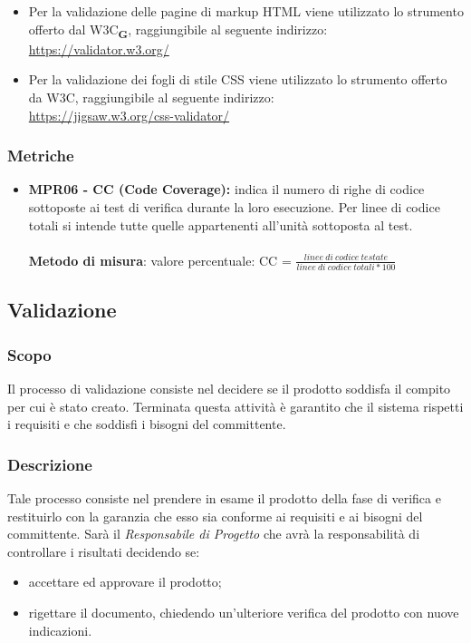 \begin{itemize}
    \item Per la validazione delle pagine di markup HTML viene utilizzato lo strumento offerto dal W3C\textsubscript{\textbf{G}}, raggiungibile al seguente indirizzo:\\
          \href{https://validator.w3.org/}{https://validator.w3.org/}
    \item Per la validazione dei fogli di stile CSS viene utilizzato lo strumento offerto da W3C, raggiungibile al seguente indirizzo:\\
          \href{https://jigsaw.w3.org/css-validator/}{https://jigsaw.w3.org/css-validator/}

\end{itemize}

\subsubsection{Metriche}
\begin{itemize}
    \item \textbf{MPR06 - CC (Code Coverage):} indica il numero di righe di codice sottoposte ai test di verifica durante la loro esecuzione. Per linee di codice totali
          si intende tutte quelle appartenenti all'unità sottoposta al test.\\
          \\\textbf{Metodo di misura}: valore percentuale: CC = $\frac{linee \ di \ codice \ testate}{linee \ di \ codice \ totali * 100}$
\end{itemize}

\subsection{Validazione}
\subsubsection{Scopo}
Il processo di validazione consiste nel decidere se il prodotto soddisfa il compito per cui è stato creato. Terminata questa attività è
garantito che il sistema rispetti i requisiti e che soddisfi i bisogni del committente.
\subsubsection{Descrizione}
Tale processo consiste nel prendere in esame il prodotto della fase di verifica e restituirlo con la garanzia che esso sia
conforme ai requisiti e ai bisogni del committente.
Sarà il \textit{Responsabile di Progetto} che avrà la responsabilità di controllare i risultati decidendo se:
\begin{itemize}
    \item accettare ed approvare il prodotto;
    \item rigettare il documento, chiedendo un'ulteriore verifica del prodotto con nuove indicazioni.
\end{itemize}
